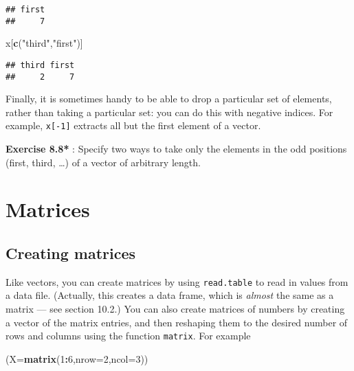 \documentclass[11pt,]{article}
\newenvironment{Shaded}{\begin{snugshade}}{\end{snugshade}}
\newcommand{\KeywordTok}[1]{\textcolor[rgb]{0.13,0.29,0.53}{\textbf{#1}}}
\newcommand{\DataTypeTok}[1]{\textcolor[rgb]{0.13,0.29,0.53}{#1}}
\newcommand{\DecValTok}[1]{\textcolor[rgb]{0.00,0.00,0.81}{#1}}
\newcommand{\StringTok}[1]{\textcolor[rgb]{0.31,0.60,0.02}{#1}}
\newcommand{\OperatorTok}[1]{\textcolor[rgb]{0.81,0.36,0.00}{\textbf{#1}}}
\newcommand{\NormalTok}[1]{#1}
\begin{document}
\begin{verbatim}
## first 
##     7
\end{verbatim}

\begin{Shaded}
\begin{Highlighting}[]
\NormalTok{x[}\KeywordTok{c}\NormalTok{(}\StringTok{"third"}\NormalTok{,}\StringTok{"first"}\NormalTok{)]}
\end{Highlighting}
\end{Shaded}

\begin{verbatim}
## third first 
##     2     7
\end{verbatim}

Finally, it is sometimes handy to be able to drop a particular set of
elements, rather than taking a particular set: you can do this with
negative indices. For example, \texttt{x{[}-1{]}} extracts all but the
first element of a vector.

\textbf{Exercise 8.8* }: Specify two ways to take only the elements in
the odd positions (first, third, \ldots{}) of a vector of arbitrary
length.

\section{Matrices}\label{matrices}

\subsection{Creating matrices}\label{creating-matrices}

Like vectors, you can create matrices by using \texttt{read.table} to
read in values from a data file. (Actually, this creates a data frame,
which is \emph{almost} the same as a matrix --- see section 10.2.) You
can also create matrices of numbers by creating a vector of the matrix
entries, and then reshaping them to the desired number of rows and
columns using the function \texttt{matrix}. For example

\begin{Shaded}
\begin{Highlighting}[]
\NormalTok{(}\DataTypeTok{X=}\KeywordTok{matrix}\NormalTok{(}\DecValTok{1}\OperatorTok{:}\DecValTok{6}\NormalTok{,}\DataTypeTok{nrow=}\DecValTok{2}\NormalTok{,}\DataTypeTok{ncol=}\DecValTok{3}\NormalTok{))}
\end{Highlighting}
\end{Shaded}
\end{document}
